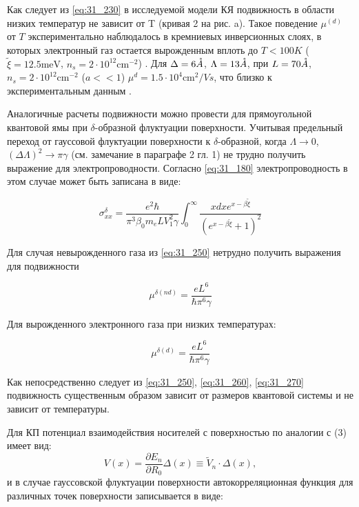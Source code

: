 Как следует из \eqref{eq:31_230} в исследуемой модели КЯ подвижность в области низких температур не зависит от T (кривая 2 на рис. a). Такое поведение $\mu ^{(d)} $ от $T$ экспериментально наблюдалось в кремниевых инверсионных слоях, в которых электронный газ остается вырожденным вплоть до $T<100 K$ ($\tilde{\xi }=12.5 \text{meV}$, $n_{s} =2\cdot 10^{12} \text{cm}^{-2} $) \cite{Stern1980}. Для $\Delta =6\AA$, $\Lambda =13 \AA$, при $L=70 \AA$, $n_{s} =2\cdot 10^{12}  \text{cm}^{-2} $ ($a<<1$) $\mu ^{d} =1.5\cdot 10^{4} \text{cm}^{2} /{Vs}$, что близко к экспериментальным данным \cite{Stern1980}.

Аналогичные расчеты подвижности можно провести для прямоугольной квантовой ямы при $\delta $-образной флуктуации поверхности. Учитывая предельный переход от гауссовой флуктуации поверхности к $\delta $-образной, когда $\Lambda \to 0$, ${\left(\Delta \Lambda \right)}^2\to \pi \gamma $ (см. замечание в параграфе 2 гл. 1) не трудно получить выражение для электропроводности. Согласно \eqref{eq:31_180} электропроводность в этом случае может быть записана в виде:

\begin{equation} \label{eq:31_250}
{\sigma }^{\delta }_{xx}=\frac{e^2\hbar }{{\pi }^3{\beta }_0m_eLV^2_1\gamma }\int^{\infty }_0{\frac{xd xe^{x-\beta \widetilde{\xi }}}{{\left(e^{x-\beta \widetilde{\xi }}+1\right)}^2}}
\end{equation} 

\noindent Для случая невырожденного газа из \eqref{eq:31_250} нетрудно получить выражения для подвижности

\begin{equation} \label{eq:31_260}
{\mu }^{\delta \left(nd\right)}=\frac{eL^6}{\hbar {\pi }^6\gamma }
\end{equation}

\noindent Для вырожденного электронного газа при низких температурах:

\begin{equation} \label{eq:31_270}
{\mu }^{\delta \left(d\right)}=\frac{eL^6}{\hbar {\pi }^6\gamma }
\end{equation}


\noindent Как непосредственно следует из \eqref{eq:31_250}, \eqref{eq:31_260}, \eqref{eq:31_270} подвижность существенным образом зависит от размеров квантовой системы и не зависит от температуры.

Для КП потенциал взаимодействия носителей с поверхностью по аналогии с (3) имеет вид:
\[
V(x)=\frac{\partial E_{n} }{\partial R_{0} } \Delta (x)\equiv \tilde{V}_{n} \cdot \Delta (x),
\] 
и в случае гауссовской флуктуации поверхности автокорреляционная функция для различных точек поверхности записывается в виде:

